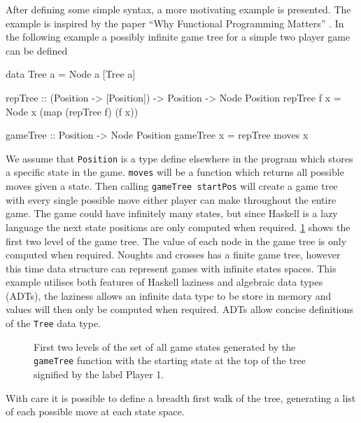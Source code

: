 \documentclass[float=false, crop=false]{standalone}
\begin{document}
After defining some simple syntax, a more motivating example is presented. The example is 
inspired by the paper ``Why Functional Programming Matters''
\cite[]{whyfpm}. 
In the following example a possibly infinite game tree for a simple
two player game can be defined 
\begin{HaskellLst}
data Tree a = Node a [Tree a]

repTree :: (Position -> [Position]) -> Position -> Node Position
repTree f x = Node x (map (repTree f) (f x))

gameTree :: Position -> Node Position
gameTree x = repTree moves x
\end{HaskellLst}
We assume that \verb|Position| is a type define elsewhere in the program 
which stores a specific state in the game. 
\verb|moves| will be a function which returns all possible moves given a state.
Then calling \verb|gameTree startPos| will create
a game tree with every single possible move either player can make throughout
the entire game. The game could have infinitely many states, but since
Haskell is a lazy language the next state positions are only computed
when required. \cref{figure:tictactoeTree} shows the first two level of the game tree.
The value of each node in the game tree is only computed when required. Noughts and
crosses has a finite game tree, however this time data structure can represent games 
with infinite states spaces. This example utilises both features
of Haskell laziness and algebraic data types (ADTs), the laziness allows an 
infinite data type to be store in memory and values will then only be computed when
required. ADTs allow concise definitions of the \verb|Tree| data type.
\begin{figure}
  \centering
{}
\caption[Noughts and crosses game states]{First two levels of the set of all game states generated by the 
  \texttt{gameTree} function with the starting state at the top of 
  the tree signified by the label \textcolor{pgrey}{\textsf{Player 1}}.}
\label{figure:tictactoeTree}
\end{figure}
With care it is possible to define a breadth first walk of the tree, generating 
a list of each possible move at each state space. 
\end{document}
